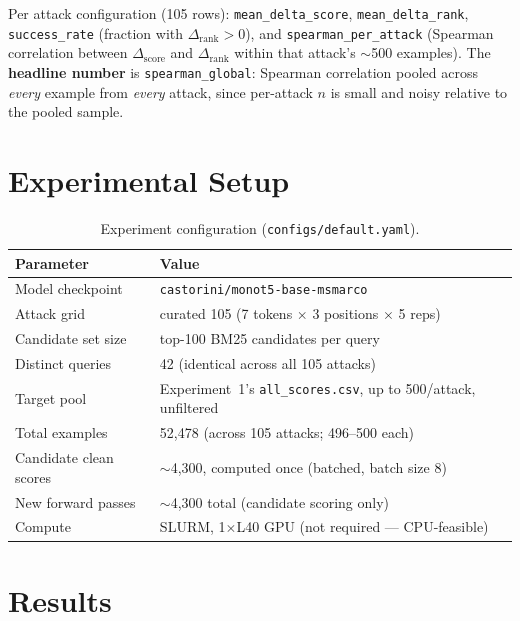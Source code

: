 \documentclass[11pt]{article}
\newcommand{\score}{\operatorname{score}}
\newcommand{\rank}{\operatorname{rank}}
\begin{document}
Per attack configuration (105 rows): \texttt{mean\_delta\_score},
\texttt{mean\_delta\_rank}, \texttt{success\_rate} (fraction with
$\Delta_{\rank}>0$), and \texttt{spearman\_per\_attack} (Spearman
correlation between $\Delta_{\score}$ and $\Delta_{\rank}$ within that
attack's $\sim$500 examples). The \textbf{headline number} is
\texttt{spearman\_global}: Spearman correlation pooled across
\emph{every} example from \emph{every} attack, since per-attack $n$ is
small and noisy relative to the pooled sample.

\section{Experimental Setup}

\begin{table}[H]
\centering
\caption{Experiment configuration (\texttt{configs/default.yaml}).}
\label{tab:config}
\begin{tabular}{ll}
\toprule
Parameter & Value \\
\midrule
Model checkpoint       & \texttt{castorini/monot5-base-msmarco} \\
Attack grid             & curated 105 (7 tokens $\times$ 3 positions $\times$ 5 reps) \\
Candidate set size      & top-100 BM25 candidates per query \\
Distinct queries        & 42 (identical across all 105 attacks) \\
Target pool             & Experiment~1's \texttt{all\_scores.csv}, up to 500/attack, unfiltered \\
Total examples          & 52{,}478 (across 105 attacks; 496--500 each) \\
Candidate clean scores  & $\sim$4{,}300, computed once (batched, batch size 8) \\
New forward passes      & $\sim$4{,}300 total (candidate scoring only) \\
Compute                 & SLURM, 1$\times$L40 GPU (not required — CPU-feasible) \\
\bottomrule
\end{tabular}
\end{table}

\section{Results}
\end{document}
